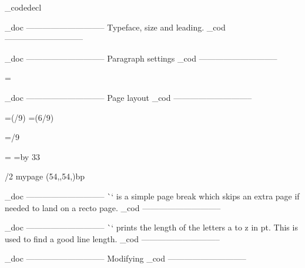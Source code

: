 \_codedecl 

    \_doc -----------------------------
    Typeface, size and leading.
    \_cod -----------------------------

\fontfam[ebgaramond]
\typosize[11/14]

    \_doc -----------------------------
    Paragraph settings
    \_cod -----------------------------

\parskip=0pt
\parindent=\baselineskip

\lineskiplimit-100pt

    \_doc -----------------------------
    Page layout
    \_cod -----------------------------



\newdimen\pagewidth     \pagewidth=6in
\newdimen\spinemargin   \spinemargin=\dimexpr(\pagewidth/9)\relax
\newdimen\measure       \measure=\dimexpr(6\pagewidth/9)

\newdimen\pageheight    \pageheight=9in 
\newdimen\depth         \depth=6in     
\newdimen\topmargin     \topmargin=/9\relax
                        \baselineskip
                        \baselineskip

%

\hsize=\measure
\vsize=\topskip \advance\vsize by 33\baselineskip %

\margins/2 mypage (54,,54,)bp



    \_doc -----------------------------
    \`\skiptorecto` is a simple page break which skips an extra page
    if needed to land on a recto page.
    \_cod -----------------------------

\def\skiptorecto{%
    \vfil\break
    \ifodd\pageno\else\vfil\break\fi
}

    \_doc -----------------------------
    \`\alphabetlength` prints the length of the letters a to z in pt.
    This is used to find a good line length.
    \_cod -----------------------------

\def\alphabetlength{%
    \setbox0=\hbox{abcdefghijklmnopqrstuvwxyz}%
    \the\wd0
}

    \_doc -----------------------------
    Modifying \chap 
    \_cod -----------------------------

\let\chapter\chap

